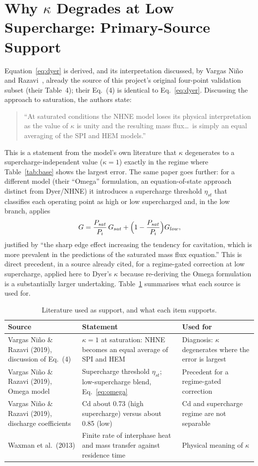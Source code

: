 \documentclass[11pt,a4paper]{article}
\begin{document}
\section{Why $\kappa$ Degrades at Low Supercharge: Primary-Source Support}\label{sec:source}
Equation~\eqref{eq:dyer} is derived, and its interpretation discussed, by Vargas Ni\~no and Razavi~\cite{nino2019}, already the source of this project's original four-point validation subset (their Table~4); their Eq.~(4) is identical to Eq.~\eqref{eq:dyer}. Discussing the approach to saturation, the authors state:
\begin{quote}\small
``At saturated conditions the NHNE model loses its physical interpretation as the value of $\kappa$ is unity and the resulting mass flux\ldots\ is simply an equal averaging of the SPI and HEM models.''
\end{quote}
This is a statement from the model's own literature that $\kappa$ degenerates to a supercharge-independent value ($\kappa=1$) exactly in the regime where Table~\ref{tab:base} shows the largest error. The same paper goes further: for a different model (their ``Omega'' formulation, an equation-of-state approach distinct from Dyer/NHNE) it introduces a supercharge threshold $\eta_{st}$ that classifies each operating point as high or low supercharged and, in the low branch, applies
\begin{equation}
G=\frac{P_{sat}}{P_i}\,G_{sat}+\Bigl(1-\frac{P_{sat}}{P_i}\Bigr)G_{low},
\label{eq:omega}
\end{equation}
justified by ``the sharp edge effect increasing the tendency for cavitation, which is more prevalent in the predictions of the saturated mass flux equation.'' This is direct precedent, in a source already cited, for a regime-gated correction at low supercharge, applied here to Dyer's $\kappa$ because re-deriving the Omega formulation is a substantially larger undertaking. Table~\ref{tab:source} summarises what each source is used for.

\begin{table}[!htbp]
\centering\small
\caption{Literature used as support, and what each item supports.}
\label{tab:source}
\begin{tabular}{p{3.9cm}p{6.2cm}p{4.4cm}}\toprule
Source & Statement & Used for\\\midrule
Vargas Ni\~no \& Razavi (2019), discussion of Eq.~(4) & $\kappa=1$ at saturation: NHNE becomes an equal average of SPI and HEM & Diagnosis: $\kappa$ degenerates where the error is largest\\
Vargas Ni\~no \& Razavi (2019), Omega model & Supercharge threshold $\eta_{st}$; low-supercharge blend, Eq.~\eqref{eq:omega} & Precedent for a regime-gated correction\\
Vargas Ni\~no \& Razavi (2019), discharge coefficients & Cd about 0.73 (high supercharge) versus about 0.85 (low) & Cd and supercharge regime are not separable\\
Waxman et al.\ (2013) & Finite rate of interphase heat and mass transfer against residence time & Physical meaning of $\kappa$\\\bottomrule
\end{tabular}
\end{table}
\end{document}
